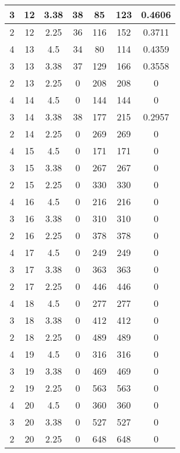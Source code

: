 \documentclass[letterpaper, 12pt]{article}
\begin{document}
\begin{longtable}{|c|c|c|c|c|c|c|}
\hline
3 & 12 & 3.38 & 38 & 85 & 123 & 0.4606 \\
\hline
2 & 12 & 2.25 & 36 & 116 & 152 & 0.3711 \\
\hline
4 & 13 & 4.5 & 34 & 80 & 114 & 0.4359 \\
\hline
3 & 13 & 3.38 & 37 & 129 & 166 & 0.3558 \\
\hline
2 & 13 & 2.25 & 0 & 208 & 208 & 0 \\
\hline
4 & 14 & 4.5 & 0 & 144 & 144 & 0 \\
\hline
3 & 14 & 3.38 & 38 & 177 & 215 & 0.2957 \\
\hline
2 & 14 & 2.25 & 0 & 269 & 269 & 0 \\
\hline
4 & 15 & 4.5 & 0 & 171 & 171 & 0 \\
\hline
3 & 15 & 3.38 & 0 & 267 & 267 & 0 \\
\hline
2 & 15 & 2.25 & 0 & 330 & 330 & 0 \\
\hline
4 & 16 & 4.5 & 0 & 216 & 216 & 0 \\
\hline
3 & 16 & 3.38 & 0 & 310 & 310 & 0 \\
\hline
2 & 16 & 2.25 & 0 & 378 & 378 & 0 \\
\hline
4 & 17 & 4.5 & 0 & 249 & 249 & 0 \\
\hline
3 & 17 & 3.38 & 0 & 363 & 363 & 0 \\
\hline
2 & 17 & 2.25 & 0 & 446 & 446 & 0 \\
\hline
4 & 18 & 4.5 & 0 & 277 & 277 & 0 \\
\hline
3 & 18 & 3.38 & 0 & 412 & 412 & 0 \\
\hline
2 & 18 & 2.25 & 0 & 489 & 489 & 0 \\
\hline
4 & 19 & 4.5 & 0 & 316 & 316 & 0 \\
\hline
3 & 19 & 3.38 & 0 & 469 & 469 & 0 \\
\hline
2 & 19 & 2.25 & 0 & 563 & 563 & 0 \\
\hline
4 & 20 & 4.5 & 0 & 360 & 360 & 0 \\
\hline
3 & 20 & 3.38 & 0 & 527 & 527 & 0 \\
\hline
2 & 20 & 2.25 & 0 & 648 & 648 & 0 \\
\hline
\end{longtable}
\end{document}
